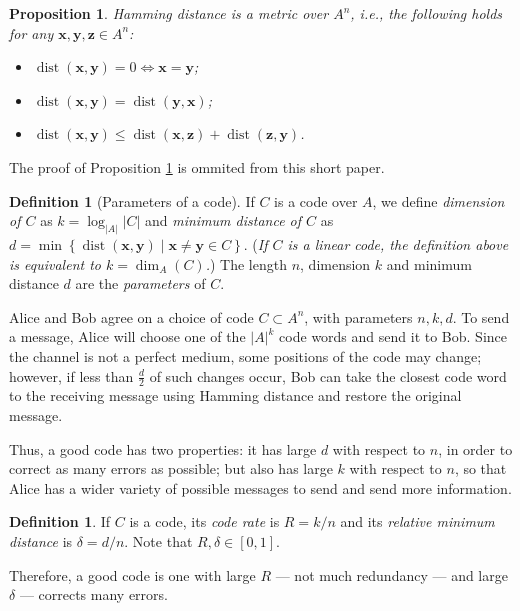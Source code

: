 \documentclass[11pt, oneside]{amsart}
\newtheorem{prop}[thm]{Proposition}
\theoremstyle{definition}
\newtheorem{defn}[thm]{Definition}
\theoremstyle{remark}
\numberwithin{equation}{section}
\DeclareMathOperator{\dist}{dist}
\DeclareMathOperator{\dimension}{dim}
\begin{document}
\begin{prop} \label{prop:hamming}
    Hamming distance is a metric over $A^n$, i.e., the following holds for any $\mathbf{x}, \mathbf{y}, \mathbf{z} \in A^n$:
    \begin{itemize}[noitemsep]
        \item $\dist(\mathbf{x}, \mathbf{y}) = 0 \iff \mathbf{x} = \mathbf{y}$;
        \item $\dist(\mathbf{x}, \mathbf{y}) = \dist(\mathbf{y}, \mathbf{x})$;
        \item $\dist(\mathbf{x}, \mathbf{y}) \le \dist(\mathbf{x}, \mathbf{z}) + \dist(\mathbf{z}, \mathbf{y})$.
    \end{itemize}
\end{prop}

The proof of Proposition \ref{prop:hamming} is ommited from this short paper.

\begin{defn}[Parameters of a code]
	If $C$ is a code over $A$, we define \emph{dimension of $C$} as $k = \log_{|A|}|C|$ and \emph{minimum distance of $C$} as $d = \min\left\{\dist(\mathbf{x}, \mathbf{y}) \mid \mathbf{x} \neq \mathbf{y} \in C\right\}$.
	(\emph{If $C$ is a linear code, the definition above is equivalent to $k = \dimension_{A}(C)$.})
	The length $n$, dimension $k$ and minimum distance $d$ are the \emph{parameters} of $C$.
\end{defn}

Alice and Bob agree on a choice of code $C \subset A^n$, with parameters $n, k, d$.
To send a message, Alice will choose one of the $|A|^k$ code words and send it to Bob.
Since the channel is not a perfect medium, some positions of the code may change;
however, if less than $\frac{d}{2}$ of such changes occur, Bob can take the closest code word to the receiving message using Hamming distance and restore the original message.

Thus, a good code has two properties: it has large $d$ with respect to $n$, in order to correct as many errors as possible;
but also has large $k$ with respect to $n$, so that Alice has a wider variety of possible messages to send and send more information.

\begin{defn}
	If $C$ is a code, its \emph{code rate} is $R = k/n$ and its \emph{relative minimum distance} is $\delta = d/n$.
	Note that $R, \delta \in [0, 1]$.
\end{defn}

Therefore, a good code is one with large $R$ --- not much redundancy --- and large $\delta$ --- corrects many errors. 
\end{document}
